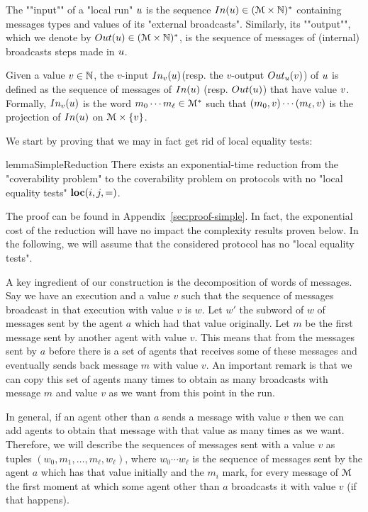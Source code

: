 \begin{definition}
	The ""input"" of a "local run" $u$ is the sequence $\Input{\localrun} \in (\messages \times \nats)^*$ containing messages types and values of its "external broadcasts".
	Similarly, its ""output"", which we denote by $\Output{\localrun} \in (\messages \times \nats)^*$, is the sequence of messages of (internal) broadcasts steps made in $u$.
	
	Given a value $v \in \mathbb{N} $, the $v$-input $\vinput{\aval}{\localrun} $(resp. the $v$-output $\voutput{\localrun}{\aval}$) of $u$ is defined as the sequence of messages of $\Input{\localrun}$ (resp. $\Output{\localrun}$) that have value $v$. Formally, $\vinput{\aval}{\localrun}$ is the word $m_0 \cdots m_{\ell} \in \mathcal{M}^*$ such that $(m_0, v) \cdots (m_{\ell}, v)$ is the projection of $\Input{\localrun}$ on $\mathcal{M} \times \{v\}$. 
\end{definition}

We start by proving that we may in fact get rid of local equality tests:

\begin{restatable}{lemma}{SimpleReduction}
	\label{lem:simple-reduction}
	There exists an exponential-time reduction from the "coverability problem" to the coverability problem on protocols with no "local equality tests" $\textbf{loc}(i,j,=)$.
\end{restatable}

The proof can be found in Appendix~\ref{sec:proof-simple}. In fact, the exponential cost of the reduction will have no impact the complexity results proven below.
In the following, we will assume that the considered protocol has no "local equality tests". 

A key ingredient of our construction is the decomposition of words of messages. Say we have an execution and a value $v$ such that the sequence of messages broadcast in that execution with value $v$ is $w$. Let $w'$ the subword of $w$ of messages sent by the agent $a$ which had that value originally. Let $m$ be the first message sent by another agent with value $v$. This means that from the messages sent by $a$ before there is a set of agents that receives some of these messages and eventually sends back message $m$ with value $v$. An important remark is that we can copy this set of agents many times to obtain as many broadcasts with message $m$ and value $v$ as we want from this point in the run.

In general, if an agent other than $a$ sends a message with value $v$ then we can add agents to obtain that message with that value as many times as we want.
Therefore, we will describe the sequences of messages sent with a value $v$ as tuples $(w_0, m_1, \ldots, m_\ell, w_\ell)$, where $w_0 \cdots w_\ell$ is the sequence of messages sent by the agent $a$ which has that value initially and the $m_i$ mark, for every message of $\mathcal{M}$ the first moment at which some agent other than $a$ broadcasts it with value $v$ (if that happens).

